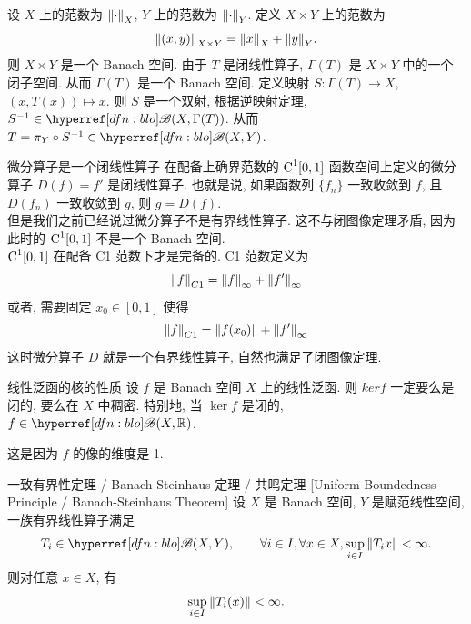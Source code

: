         \begin{prf}
            设 \(X\) 上的范数为 \(\norm{\cdot}_X\), \(Y\) 上的范数为 \(\norm{\cdot}_Y\). 定义 \(X\times Y\) 上的范数为
            \[\norm{(x,y)}_{X\times Y}=\norm{x}_X+\norm{y}_Y.\]
            则 \(X\times Y\) 是一个 Banach 空间. 由于 \(T\) 是闭线性算子, \(\Gamma(T)\) 是 \(X\times Y\) 中的一个闭子空间. 从而 \(\Gamma(T)\) 是一个 Banach 空间. 定义映射 \(S:\Gamma(T)\to X\), \((x,T(x))\mapsto x\). 则 \(S\) 是一个双射, 根据逆映射定理, \(S^{-1}\in\blo(X,\Gamma(T))\). 从而 \(T=\pi_Y\circ S^{-1}\in\blo(X,Y)\).
        \end{prf}

        \begin{cxmp}
            {微分算子是一个闭线性算子}
            在配备上确界范数的 \(\operatorname{\mathrm{C}}^1[0,1]\) 函数空间上定义的微分算子 \(D(f)=f'\) 是闭线性算子. 也就是说, 如果函数列 \(\{f_n\}\) 一致收敛到 \(f\), 且 \(D(f_n)\) 一致收敛到 \(g\), 则 \(g=D(f)\). \\
            但是我们之前已经说过微分算子不是有界线性算子. 这不与闭图像定理矛盾, 因为此时的 \(\operatorname{\mathrm{C}}^1[0,1]\) 不是一个 Banach 空间.\\
            \(\operatorname{\mathrm{C}}^1[0,1]\) 在配备 C1 范数下才是完备的. C1 范数定义为
            \[\norm{f}_{C1}=\norm{f}_{\infty}+\norm{f'}_{\infty}\]
            或者, 需要固定 \(x_0\in[0,1]\) 使得 \[\norm{f}_{C1}=\norm{f(x_0)}+\norm{f'}_{\infty}\]
            这时微分算子 \(D\) 就是一个有界线性算子, 自然也满足了闭图像定理. 
        \end{cxmp}

        \begin{thm}
            {线性泛函的核的性质}
            设 \(f\) 是 Banach 空间 \(X\) 上的线性泛函. 则 \(ker f\) 一定要么是闭的, 要么在 \(X\) 中稠密. 特别地, 当 \(\ker f\) 是闭的, \(f\in\blo(X,\R)\).
        \end{thm}

        \begin{prf}
            这是因为 \(f\) 的像的维度是 1.
        \end{prf}

        \begin{thm}
            {一致有界性定理 / Banach-Steinhaus 定理 / 共鸣定理}
            [Uniform Boundedness Principle / Banach-Steinhaus Theorem]
            设 \(X\) 是 Banach 空间, \(Y\) 是赋范线性空间, 一族有界线性算子满足
            \[T_i\in\blo(X, Y), \qquad \forall i\in I,\forall x\in X, \sup_{i\in I} \norm{T_i x} < \infty.\]
            则对任意 \(x\in X\), 有
            \[\sup_{i\in I} \norm{T_i(x)} < \infty.\]
        \end{thm}

